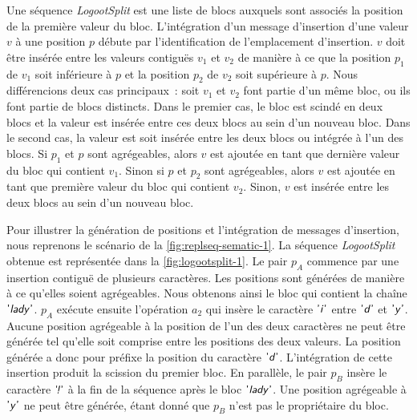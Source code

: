 Une séquence \emph{LogootSplit} est une liste de blocs auxquels sont associés la position de la première valeur du bloc.
L'intégration d'un message d'insertion d'une valeur $v$ à une position $p$ débute par l'identification de l'emplacement d'insertion.
$v$ doit être insérée entre les valeurs contiguës $v_1$ et $v_2$ de manière à ce que la position $p_1$ de $v_1$ soit inférieure à $p$ et la position $p_2$ de $v_2$ soit supérieure à $p$.
Nous différencions deux cas principaux~: soit $v_1$ et $v_2$ font partie d'un même bloc, ou ils font partie de blocs distincts.
Dans le premier cas, le bloc est scindé en deux blocs et la valeur est insérée entre ces deux blocs au sein d'un nouveau bloc.
Dans le second cas, la valeur est soit insérée entre les deux blocs ou intégrée à l'un des blocs.
Si $p_1$ et $p$ sont agrégeables, alors $v$ est ajoutée en tant que dernière valeur du bloc qui contient $v_1$.
Sinon si $p$ et $p_2$ sont agrégeables, alors $v$ est ajoutée en tant que première valeur du bloc qui contient $v_2$.
Sinon, $v$ est insérée entre les deux blocs au sein d'un nouveau bloc.

Pour illustrer la génération de positions et l'intégration de messages d'insertion, nous reprenons le scénario de la \autoref{fig:replseq-sematic-1}.
La séquence \emph{LogootSplit} obtenue est représentée dans la \autoref{fig:logootsplit-1}.
Le pair $p_A$ commence par une insertion contiguë de plusieurs caractères.
Les positions sont générées de manière à ce qu'elles soient agrégeables.
Nous obtenons ainsi le bloc qui contient la chaîne $\textsf{'\textit{lady}'}$.
$p_A$ exécute ensuite l'opération $a_2$ qui insère le caractère $\textsf{'\textit{i}'}$ entre $\textsf{'\textit{d}'}$ et $\textsf{'\textit{y}'}$.
Aucune position agrégeable à la position de l'un des deux caractères ne peut être générée tel qu'elle soit comprise entre les positions des deux valeurs.
La position générée a donc pour préfixe la position du caractère $\textsf{'\textit{d}'}$.
L'intégration de cette insertion produit la scission du premier bloc.
En parallèle, le pair $p_B$ insère le caractère $\textsf{'\textit{\negthinspace!}'}$ à la fin de la séquence après le bloc $\textsf{'\textit{lady}'}$.
Une position agrégeable à $\textsf{'\textit{y}'}$ ne peut être générée, étant donné que $p_B$ n'est pas le propriétaire du bloc.

